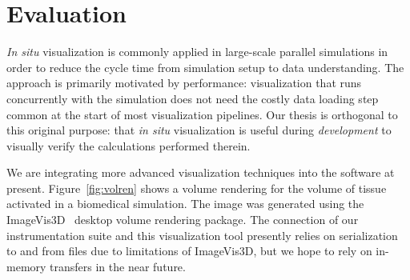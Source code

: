 \section{Evaluation}

%




\textit{In situ} visualization is commonly applied in large-scale
parallel simulations in order to reduce the cycle time from simulation
setup to data understanding.  The approach is primarily motivated by
performance: visualization that runs concurrently with the simulation
does not need the costly data loading step common at the start of most
visualization pipelines.  Our thesis is orthogonal to this original
purpose: that \textit{in situ} visualization is useful during
\emph{development} to visually verify the calculations performed
therein.

%
%


We are integrating more advanced visualization techniques into the
software at present.  Figure~\ref{fig:volren} shows a volume rendering
for the volume of tissue activated in a biomedical simulation.  The
image was generated using the
ImageVis3D~\cite{Fogal:2010:Tuvok} desktop volume rendering package.
The connection of our instrumentation suite and this visualization tool
presently relies on serialization to and from files due to limitations
of ImageVis3D, but we hope to rely on in-memory transfers in the near
future.

